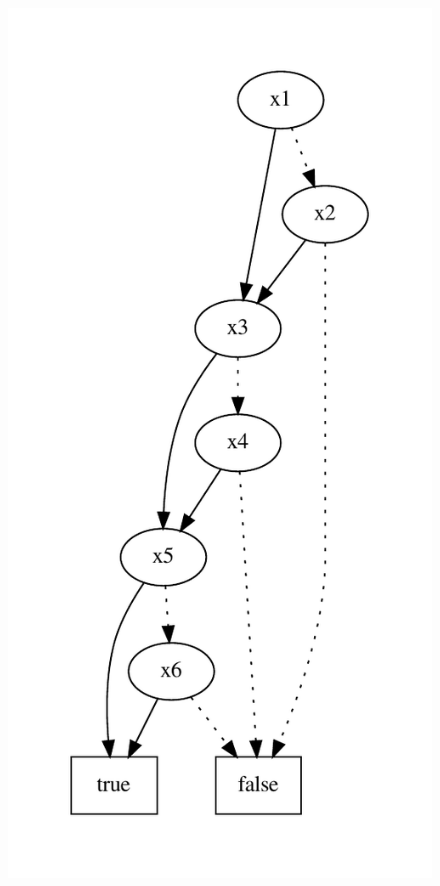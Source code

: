 \documentclass[a4paper, oneside]{report}
\begin{document}
\begin{figure}[h]
      \includegraphics[scale = 0.5]{exemple/bon_Ordre.pdf}

\end{figure}
\end{document}
